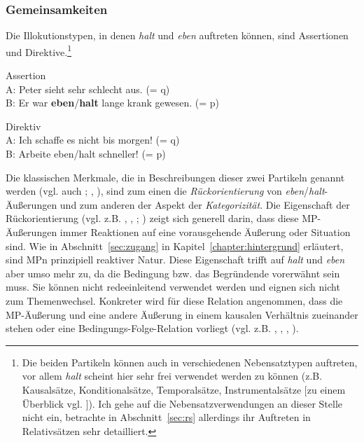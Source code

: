 \subsubsection{Gemeinsamkeiten}
Die Illokutionstypen, in denen \textit{halt} und \textit{eben} auftreten können, sind Assertionen  und  Direktive.\footnote{Die beiden Partikeln können auch in verschiedenen Nebensatztypen auftreten, vor allem \textit{halt} scheint hier
sehr frei verwendet werden zu können (z.B. Kausalsätze, Konditionalsätze, Temporalsätze, Instrumentalsätze $[$zu einem Überblick vgl. \citealt[202-203]{Hentschel1986}$]$). Ich gehe auf die Nebensatzverwendungen an dieser Stelle nicht ein, betrachte in Abschnitt~\ref{sec:rs} allerdings ihr Auftreten in Relativsätzen sehr detailliert.}

\begin{exe}
	\ex\label{542} Assertion\\
	A: Peter sieht sehr schlecht aus. (= q)\\
	B: Er war \textbf{eben}/\textbf{halt} lange krank gewesen. (= p)		
\end{exe}	

\begin{exe}
	\ex\label{543} Direktiv\\
	A: Ich schaffe es nicht bis morgen! (= q)\\
	B: Arbeite eben/halt schneller! (= p)	
	\hfill\hbox{\citet[340/215]{Karagjosova2004}} 	
\end{exe}				    
Die klassischen Merkmale, die in Beschreibungen dieser zwei Partikeln genannt werden (vgl. auch \citealt[150-152]{Mueller2016a}; \citeyear[165-169]{Mueller2016b}, \citeyear[239-243]{Mueller2017a}), sind zum einen die \textit{Rückorientierung} von \textit{eben}/\textit{halt}-Äußerungen und zum anderen der Aspekt der \textit{Kategorizität}. Die Eigenschaft der Rückorientierung (vgl. z.B. \citealt[98, 224]{Dahl1988}, \citealt[120, 125-126]{Thurmair1989}, \citealt[340]{Karagjosova2003}; \citeyear[208]{Karagjosova2004}) zeigt sich generell darin, dass diese MP-Äußerungen immer Reaktionen auf eine vorausgehende Äußerung oder Situation sind. Wie in Abschnitt~\ref{sec:zugang} in Kapitel~\ref{chapter:hintergrund} erläutert, sind MPn prinzipiell reaktiver Natur. Diese Eigenschaft trifft auf \textit{halt} und \textit{eben} aber umso mehr zu, da die Bedingung bzw. das Begründende vorerwähnt sein muss. Sie können nicht redeeinleitend verwendet werden und eignen sich nicht zum Themenwechsel. Konkreter wird für diese Relation angenommen, dass die MP-Äußerung und eine andere Äußerung in einem kausalen Verhältnis  zueinander stehen oder eine Bedingungs-Folge-Relation  vorliegt (vgl. z.B. \citealt[40]{Weydt1969}, \citealt[101, 288 Fn 60, 125]{Dahl1988}, \citealt[121]{Helbig1990}, \citealt[67]{Koenig1997}). 

